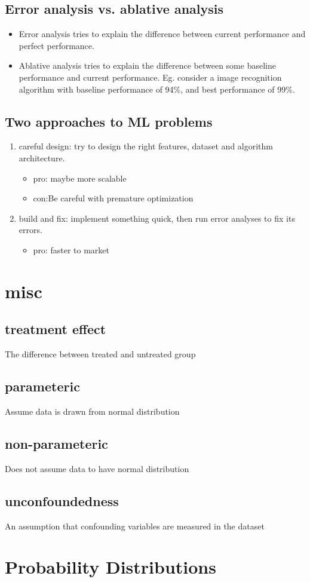 \documentclass[11pt]{article}
\begin{document}
\subsection{Error analysis vs. ablative analysis}
\label{sec:org62f0942}
\begin{itemize}
\item Error analysis tries to explain the difference between current performance and perfect performance.
\item Ablative analysis tries to explain the difference between some baseline performance and current performance. Eg. consider a image recognition algorithm with baseline performance of 94\%, and best performance of 99\%.
\end{itemize}
\subsection{Two approaches to ML problems}
\label{sec:orgf18d0d7}
\begin{enumerate}
\item careful design: try to design the right features, dataset and algorithm architecture. 
\begin{itemize}
\item pro: maybe more scalable
\item con:Be careful with premature optimization
\end{itemize}
\item build and fix: implement something quick, then run error analyses to fix its errors. 
\begin{itemize}
\item pro: faster to market
\end{itemize}
\end{enumerate}
\section{misc}
\label{sec:org354c076}
\subsection{treatment effect}
\label{sec:org6a51cdb}
The difference between treated and untreated group
\subsection{parameteric}
\label{sec:org4825f2c}
Assume data is drawn from normal distribution
\subsection{non-parameteric}
\label{sec:orgcc90707}
Does not assume data to have normal distribution
\subsection{unconfoundedness}
\label{sec:org817179f}
An assumption that confounding variables are measured in the dataset  

\section{Probability Distributions}
\label{sec:org97f4278}
\end{document}
